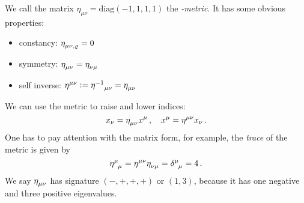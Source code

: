 We call the matrix $\eta_{\mu\nu}=\mathrm{diag}(-1,1,1,1)$ the
\emph{-metric}. It has some obvious properties:
\begin{itemize}
    \item constancy: $\tensor{\eta}{_\mu_\nu_,_\varrho}=0$
    \item symmetry: $\tensor{\eta}{_\mu_\nu}=\tensor{\eta}{_\nu_\mu}$
    \item self inverse:
    $\tensor{\eta}{^\mu^\nu}:=\tensor{{\eta^{-1}}}{_\mu_\nu}=\tensor{\eta}{_\mu_\nu}$
\end{itemize}
We can use the metric to raise and lower indices:
\begin{equation}
    x_\nu=\tensor{\eta}{_\mu_\nu}x^\mu\, ,\quad x^\mu=\tensor{\eta}{^\mu^\nu}x_\nu\, .
\end{equation}
One has to pay attention with the matrix form, for example, the \emph{trace} of
the metric is given by
\begin{equation}
    \tensor{\eta}{^\mu_\mu}=\tensor{\eta}{^\mu^\nu}\tensor{\eta}{_\nu_\mu}
    =\tensor{\delta}{^\mu_\mu}=4\, .
\end{equation}
We say $\tensor{\eta}{_\mu_\nu}$ has signature $(-,+,+,+)$ or $(1,3)$, because
it has one negative and three positive eigenvalues.
